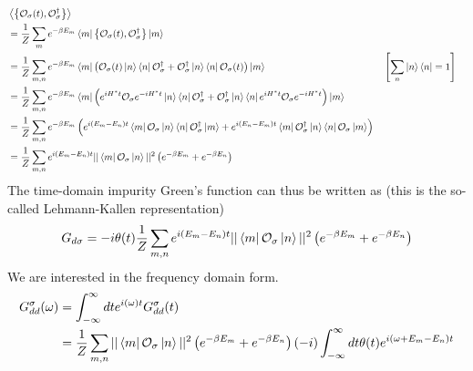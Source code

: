 \begin{equation}\begin{aligned}
	&\left<\left\{ \mathcal{O}_{\sigma}(t),\mathcal{O}^\dagger_{\sigma} \right\}  \right> \\
	&= \frac{1}{Z}\sum_{m}e^{-\beta E_m}\bra{m}\left\{ \mathcal{O}_{\sigma}(t),\mathcal{O}^\dagger_{\sigma} \right\} \ket{m}\\
	&= \frac{1}{Z}\sum_{m,n}e^{-\beta E_m}\bra{m}\left( \mathcal{O}_{\sigma}(t)\ket{n}\bra{n}\mathcal{O}^\dagger_{\sigma} + \mathcal{O}^\dagger_{\sigma}\ket{n}\bra{n}\mathcal{O}_{\sigma}(t)\right) \ket{m} && \left[\sum_n \ket{n}\bra{n} = 1\right]  \\
	&= \frac{1}{Z}\sum_{m,n}e^{-\beta E_m}\bra{m}\left( e^{iH^* t}\mathcal{O}_{\sigma}e^{-iH^* t}\ket{n}\bra{n}\mathcal{O}^\dagger_{\sigma} + \mathcal{O}^\dagger_{\sigma}\ket{n}\bra{n}e^{iH^* t}\mathcal{O}_{\sigma}e^{-iH^* t}\right) \ket{m}\\
	&= \frac{1}{Z}\sum_{m,n}e^{-\beta E_m}\left( e^{i\left( E_m - E_n \right)  t}\bra{m}\mathcal{O}_{\sigma}\ket{n}\bra{n}\mathcal{O}^\dagger_{\sigma} \ket{m} + e^{i\left( E_n - E_m \right)  t}\bra{m}\mathcal{O}^\dagger_{\sigma}\ket{n}\bra{n}\mathcal{O}_{\sigma} \ket{m}\right)\\
	&= \frac{1}{Z}\sum_{m,n}e^{i\left( E_m - E_n \right)  t}||\bra{m}\mathcal{O}_{\sigma}\ket{n}||^2\left( e^{-\beta E_m} + e^{-\beta E_n}\right)\\
\end{aligned}\end{equation}
The time-domain impurity Green's function can thus be written as (this is the so-called Lehmann-Kallen representation)
\begin{equation}\begin{aligned}
	G_{d\sigma} = -i\theta(t)\frac{1}{Z}\sum_{m,n}e^{i\left( E_m - E_n \right)  t}||\bra{m}\mathcal{O}_{\sigma}\ket{n}||^2\left( e^{-\beta E_m} + e^{-\beta E_n}\right)\\
\end{aligned}\end{equation}
We are interested in the frequency domain form.
\begin{equation}\begin{aligned}
	G_{d d}^\sigma(\omega) &= \int_{-\infty}^\infty dt e^{i \left(\omega \right)t}G_{d d}^\sigma(t) \\
			       &= \frac{1}{Z}\sum_{m,n}||\bra{m}\mathcal{O}_{\sigma}\ket{n}||^2\left( e^{-\beta E_m} + e^{-\beta E_n}\right)\left(-i\right)\int_{-\infty}^\infty dt \theta(t)e^{i\left(\omega + E_m - E_n \right)t}
\end{aligned}\end{equation}
